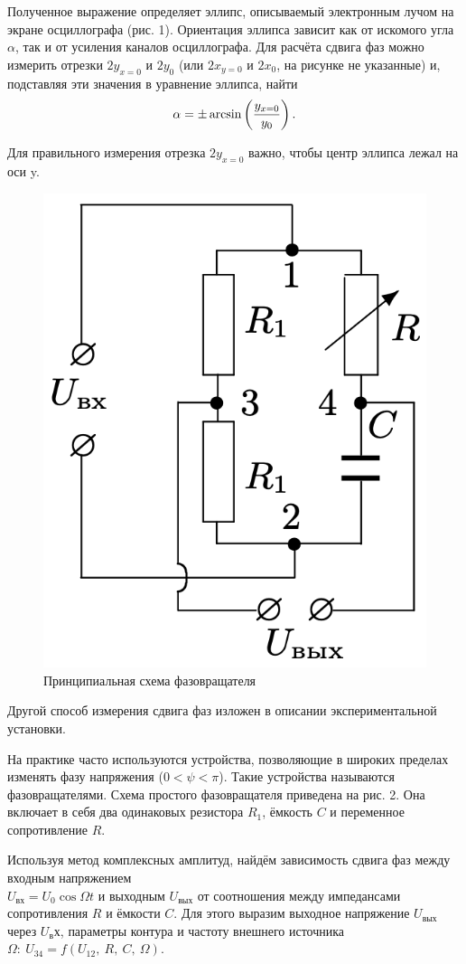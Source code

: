 \documentclass[12pt,a4paper]{article}
\begin{document}
Полученное выражение определяет эллипс, описываемый электронным лучом на экране осциллографа (рис. 1). 
Ориентация эллипса зависит как от искомого угла $\alpha$, так и от усиления каналов осциллографа. 
Для расчёта сдвига фаз можно измерить отрезки $2y_{x=0}$ и $2y_0$ (или $2x_{y=0}$ и $2x_0$, на рисунке не указанные) и, подставляя эти значения в уравнение эллипса, найти $$\alpha = \pm \arcsin \left({y_{x=0} \over y_0}\right).$$

Для правильного измерения отрезка $2y_{x=0}$ важно, чтобы центр эллипса лежал на оси y.

\newpage

\begin{figure}
    \includegraphics[width=0.8\linewidth]{phase.png}
    \caption{Принципиальная схема фазовращателя}
\end{figure}
Другой способ измерения сдвига фаз изложен в описании экспериментальной установки.

На практике часто используются устройства, позволяющие в широких пределах изменять фазу напряжения ($0 < \psi < \pi$). 
Такие устройства называются фазовращателями. 
Схема простого фазовращателя приведена на рис. 2. 
Она включает в себя два одинаковых резистора $R_1$, ёмкость $C$ и переменное сопротивление $R$.

Используя метод комплексных амплитуд, найдём зависимость сдвига фаз между входным напряжением  \\ $U_{вх} = U_0 \cos \Omega t$ и выходным $U_{вых}$ от соотношения между импедансами сопротивления $R$ и ёмкости $C$. 
Для этого выразим выходное напряжение $U_{вых}$ через $U_вх$, параметры контура и частоту внешнего источника $\Omega:\ U_{34} = f(U_{12},\ R,\ C,\ \Omega)$.
\end{document}
